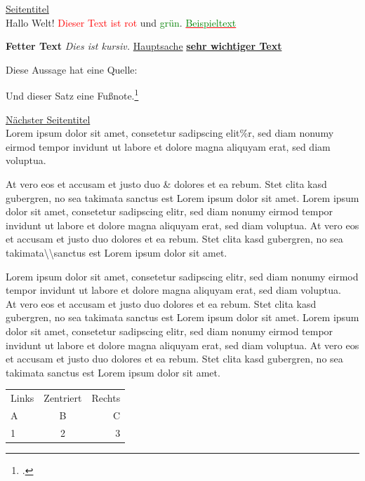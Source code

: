 \documentclass{article}
\newcommand{\pagetitle}[1]{\newpage\underline{#1}\\ }
\begin{document}
\pagetitle{Seitentitel}

Hallo Welt!
\textcolor{red}{Dieser Text ist rot} und \textcolor{green}{grün}.
\textcolor{red}{\underline{\textcolor{green}{Beispieltext}}}


\textbf{Fetter Text}
\textit{Dies ist kursiv.}
\underline{Hauptsache}
\textbf{\underline{sehr wichtiger Text}}

Diese Aussage hat eine Quelle: \cite{DemoQuelle}

Und dieser Satz eine Fußnote.\footcite{dbfakten2022}



\pagetitle{Nächster Seitentitel}
Lorem ipsum dolor sit amet, consetetur sadipscing elit\%r, sed diam nonumy eirmod tempor invidunt ut labore et dolore magna aliquyam erat, sed diam voluptua.

At vero eos et accusam et justo duo \& dolores et ea rebum. Stet clita kasd gubergren, no sea takimata sanctus est Lorem ipsum dolor sit amet. Lorem ipsum dolor sit amet, consetetur sadipscing elitr, sed diam nonumy eirmod tempor invidunt ut labore et dolore magna aliquyam erat, sed diam voluptua. At vero eos et accusam et justo duo dolores et ea rebum. Stet clita kasd gubergren, no sea takimata\textbackslash\textbackslash\space sanctus est Lorem ipsum dolor sit amet.

Lorem ipsum dolor sit amet, consetetur sadipscing elitr, sed diam nonumy eirmod tempor invidunt ut labore et dolore magna aliquyam erat, sed diam voluptua.\\ At vero eos et accusam et justo duo dolores et ea rebum. Stet clita kasd gubergren, no sea takimata sanctus est Lorem ipsum dolor sit amet. Lorem ipsum dolor sit amet, consetetur sadipscing elitr, sed diam nonumy eirmod tempor invidunt ut labore et dolore magna aliquyam erat, sed diam voluptua. At vero eos et accusam et justo duo dolores et ea rebum. Stet clita kasd gubergren, no sea takimata sanctus est Lorem ipsum dolor sit amet.

\begin{tabular}{|l|c|r|}

    Links & Zentriert & Rechts \\

    A & B & C \\

    1 & 2 & 3 \\

\end{tabular}


\newpage
\newpage
\newpage
\newpage
\printbibliography
\end{document}
